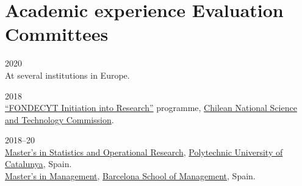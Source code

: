 \section*{Academic experience {\small Evaluation Committees}}

\begin{paracol}{2}
  2020
\switchcolumn
  \\
  At several institutions in Europe.
\end{paracol}

\begin{paracol}{2}
  2018
\switchcolumn
  \\
  \href{http://www.conicyt.cl/fondecyt/fondecyt-program/}{``FONDECYT Initiation into Research''} programme, \href{http://www.conicyt.cl/}{Chilean National Science and Technology Commission}.
\end{paracol}

\begin{paracol}{2}
  2018--20
\switchcolumn
  \\
  \href{https://mesioupcub.masters.upc.edu/en}{Master's in Statistics and Operational Research}, \href{https://www.upc.edu/en}{Polytechnic University of Catalunya}, Spain.\\
  \href{https://www.bsm.upf.edu/en/master-of-science-in-management}{Master's in Management}, \href{https://www.bsm.upf.edu}{Barcelona School of Management}, Spain.
\end{paracol}